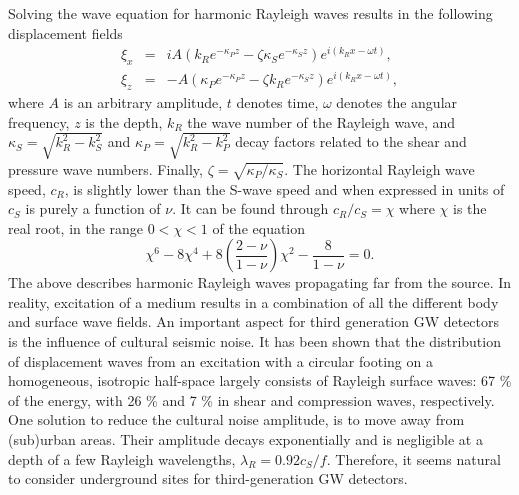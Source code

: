Solving the wave equation for harmonic Rayleigh waves results in the following displacement fields~\cite{seismic_rayleigh}
\begin{eqnarray}
	\xi_x &=& iA(k_R e^{-\kappa_P z}-\zeta \kappa_S e^{-\kappa_S z}) e^{i(k_R x-\omega t)}, \\ \nonumber
	\xi_z &=& -A (\kappa_P e^{-\kappa_P z}-\zeta k_R e^{-\kappa_S z})e^{i(k_R x-\omega t)},
	\label{eq3.39} 
\end{eqnarray}
where $A$ is an arbitrary amplitude, $t$ denotes time, $\omega$ denotes the angular frequency, $z$ is the depth, $k_R$ the wave number of the Rayleigh wave, and $\kappa_S=\sqrt{k^2_R-k^2_S}$ and $\kappa_P=\sqrt{k^2_R-k^2_P}$ decay factors related to the shear and pressure wave numbers. Finally, $\zeta=\sqrt{\kappa_P/\kappa_S}$. The horizontal Rayleigh wave speed, $c_R$, is slightly lower than the S-wave speed and when expressed in units of $c_S$ is purely a function of $\nu$.  It can be found through $c_R/c_S = \chi$ where $\chi$ is the real root, in the range $0 < \chi < 1$ of the equation~\cite{seismic_rayleigh}
\begin{equation}
	\chi^6 -8\chi^4 + 8\left(\frac{2-\nu}{1-\nu}\right)\chi^2 - \frac{8}{1-\nu}=0.
	\label{eq3.40}
\end{equation}
The above describes harmonic Rayleigh waves propagating far from the source. In reality, excitation of a medium results in a combination of all the different body and surface wave fields. An important aspect for third generation GW detectors is the influence of cultural seismic noise. It has been shown \cite{WoodsASCE} that the distribution of displacement waves from an excitation with a circular footing on a homogeneous, isotropic half-space largely consists of Rayleigh surface waves: 67 \% of the energy, with 26 \% and 7 \% in shear and compression waves, respectively. One solution to reduce the cultural noise amplitude, is to move away from (sub)urban areas. Their amplitude decays exponentially and is negligible at a depth of a few Rayleigh wavelengths, $\lambda_R = 0.92 c_S/f$. Therefore, it seems natural to consider underground sites for third-generation GW detectors.
